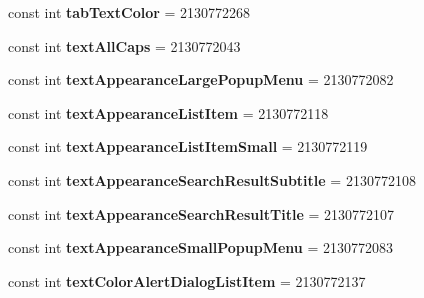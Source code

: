 \begin{DoxyCompactItemize}
const int {\bfseries tab\+Text\+Color} = 2130772268
\item 
\mbox{\label{class_sample_app_1_1_droid_1_1_resource_1_1_attribute_ad7f888450c0e0081f90fb94587478e6e}} 
const int {\bfseries text\+All\+Caps} = 2130772043
\item 
\mbox{\label{class_sample_app_1_1_droid_1_1_resource_1_1_attribute_a0e8d6c3671367e9d31ff9c413d70adcb}} 
const int {\bfseries text\+Appearance\+Large\+Popup\+Menu} = 2130772082
\item 
\mbox{\label{class_sample_app_1_1_droid_1_1_resource_1_1_attribute_a8f8732ac50325f1924e8dcc9c5d08709}} 
const int {\bfseries text\+Appearance\+List\+Item} = 2130772118
\item 
\mbox{\label{class_sample_app_1_1_droid_1_1_resource_1_1_attribute_a6b6a750767313c16430a9c0ae4273bde}} 
const int {\bfseries text\+Appearance\+List\+Item\+Small} = 2130772119
\item 
\mbox{\label{class_sample_app_1_1_droid_1_1_resource_1_1_attribute_a82c3e3017e19a344a04df56cfa33476f}} 
const int {\bfseries text\+Appearance\+Search\+Result\+Subtitle} = 2130772108
\item 
\mbox{\label{class_sample_app_1_1_droid_1_1_resource_1_1_attribute_abe1c1f03f6ae9c15a66622facd2ed2b9}} 
const int {\bfseries text\+Appearance\+Search\+Result\+Title} = 2130772107
\item 
\mbox{\label{class_sample_app_1_1_droid_1_1_resource_1_1_attribute_ab2d286f5907de37f119da525ab9f7597}} 
const int {\bfseries text\+Appearance\+Small\+Popup\+Menu} = 2130772083
\item 
\mbox{\label{class_sample_app_1_1_droid_1_1_resource_1_1_attribute_af75bd2e0a568df0febd95f15a28c9a20}} 
const int {\bfseries text\+Color\+Alert\+Dialog\+List\+Item} = 2130772137

\end{DoxyCompactItemize}
